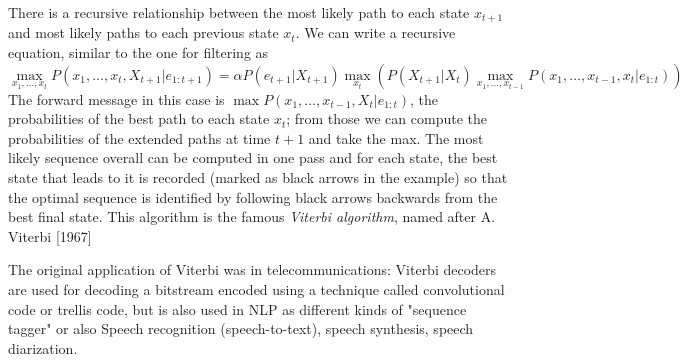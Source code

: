 There is a recursive relationship between the most likely path to each state $x_{t+1}$ 
and most likely paths to each previous state $x_t$.\newline
We can write a recursive equation, similar to the one for filtering as 
\[ \max_{x_1, \dots, x_t} P(x_1, \dots, x_t, X_{t+1} | e_{1:t+1}) = 
   \alpha P(e_{t+1} | X_{t+1}) \max_{x_t} (P(X_{t+1}|X_t) \max_{x_1, \dots, x_{t-1}}
   P(x_1, \dots, x_{t-1}, x_t | e_{1:t})) \]
The forward message in this case is $\max P(x_1, \dots, x_{t-1}, X_t | e_{1:t})$,
the probabilities of the best path to each state $x_t$; from those we can compute
the probabilities of the extended paths at time $t+1$ and take the max.\newline
The most likely sequence overall can be computed in one pass and for each state,
the best state that leads to it is recorded (marked as black arrows in the example)
so that the optimal sequence is identified by following black arrows backwards from the best
final state.\newline
This algorithm is the famous \emph{Viterbi algorithm}, named after A. Viterbi [1967]

The original application of Viterbi was in telecommunications: Viterbi decoders are used
for decoding a bitstream encoded using a technique called convolutional code or trellis code,
but is also used in NLP as different kinds of "sequence tagger" or also Speech recognition
(speech-to-text), speech synthesis, speech diarization.

